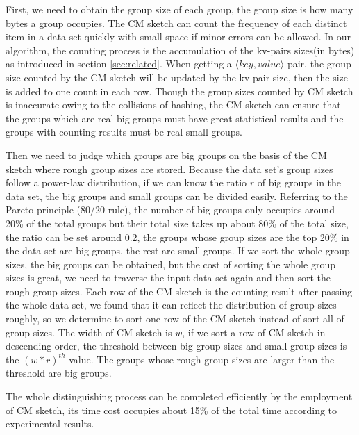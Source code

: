First, we need to obtain the group size of each group, the group size is how many bytes a group occupies. The CM sketch can count the frequency of each distinct item in a data set quickly with small space if minor errors can be allowed. In our algorithm, the counting process is the accumulation of the kv-pairs sizes(in bytes) as introduced in section \ref{sec:related}. When getting a $\langle key, value\rangle$ pair, the group size counted by the CM sketch will be updated by the kv-pair size, then the size is added to one count in each row. Though the group sizes counted by CM sketch is inaccurate owing to the collisions of hashing, the CM sketch can ensure that the groups which are real big groups must have great statistical results and the groups with counting results must be real small groups.

Then we need to judge which groups are big groups on the basis of the CM sketch where rough group sizes are stored. Because the data set's group sizes follow a power-law distribution, if we can know the ratio $r$ of big groups in the data set, the big groups and small groups can be divided easily. Referring to the Pareto principle (80/20 rule), the number of big groups only occupies around 20\% of the total groups but their total size takes up about 80\% of the total size, the ratio can be set around 0.2, the groups whose group sizes are the top 20\% in the data set are big groups, the rest are small groups. If we sort the whole group sizes, the big groups can be obtained, but the cost of sorting the whole group sizes is great, we need to traverse the input data set again and then sort the rough group sizes. Each row of the CM sketch is the counting result after passing the whole data set, we found that it can reflect the distribution of group sizes roughly, so we determine to sort one row of the CM sketch instead of sort all of group sizes. The width of CM sketch is $w$, if we sort a row of CM sketch in descending order, the threshold between big group sizes and small group sizes is the ${(w*r)}^{th}$ value. The groups whose rough group sizes are larger than the threshold are big groups.

The whole distinguishing process can be completed efficiently by the employment of CM sketch, its time cost occupies about 15\% of the total time according to experimental results.

